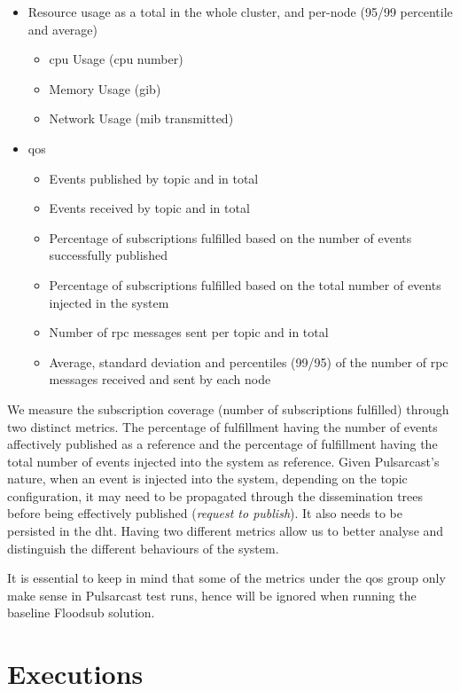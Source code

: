 \begin{itemize}
  \item Resource usage as a total in the whole cluster, and per-node (95/99
  percentile and average)
  \begin{itemize}
    \item \acrshort{cpu} Usage (\acrshort{cpu} number)
    \item Memory Usage (\acrshort{gib})
    \item Network Usage (\acrshort{mib} transmitted)
  \end{itemize}
  \item \acrshort{qos}
  \begin{itemize}
    \item Events published by topic and in total
    \item Events received by topic and in total
    \item Percentage of subscriptions fulfilled based on the number of events
    successfully published
    \item Percentage of subscriptions fulfilled based on the total number of events
    injected in the system
    \item Number of \acrshort{rpc} messages sent per topic and in total
    \item Average, standard deviation and percentiles (99/95) of the number of \acrshort{rpc} messages received and sent by each node
  \end{itemize}
\end{itemize}

We measure the subscription coverage (number of subscriptions fulfilled)
through two distinct metrics. The percentage of fulfillment having the number
of events affectively published as a reference and the percentage of
fulfillment having the total number of events injected into the system as
reference. Given Pulsarcast's nature, when an event is injected into the
system, depending on the topic configuration, it may need to be propagated
through the dissemination trees before being effectively published
(\emph{request to publish}). It also needs to be persisted in the
\acrshort{dht}. Having two different metrics allow us to better analyse and
distinguish the different behaviours of the system.

It is essential to keep in mind that some of the metrics under the \acrshort{qos} group
only make sense in Pulsarcast test runs, hence will be ignored when running the
baseline Floodsub solution.

\section{Executions}\label{executions}

